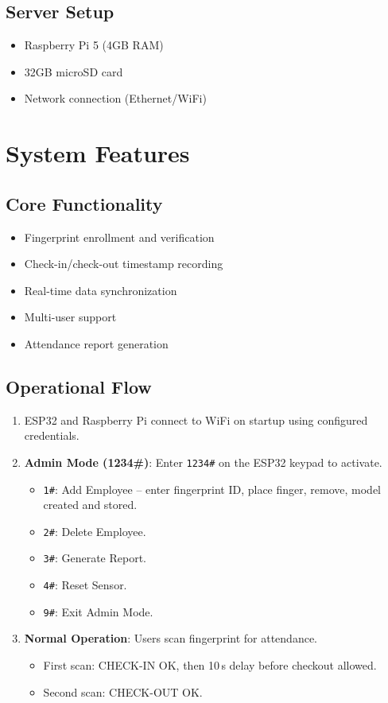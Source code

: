 \documentclass[10pt,a4paper]{article}
\begin{document}
\subsection{Server Setup}
\begin{itemize}
    \item Raspberry Pi 5 (4GB RAM)
    \item 32GB microSD card
    \item Network connection (Ethernet/WiFi)
\end{itemize}

\section{System Features}

\subsection{Core Functionality}
\begin{itemize}
    \item Fingerprint enrollment and verification
    \item Check-in/check-out timestamp recording
    \item Real-time data synchronization
    \item Multi-user support
    \item Attendance report generation
\end{itemize}

\subsection{Operational Flow}
\begin{enumerate}
  \item ESP32 and Raspberry Pi connect to WiFi on startup using configured credentials.
  \item \textbf{Admin Mode (1234\#)}: Enter \texttt{1234\#} on the ESP32 keypad to activate.
  \begin{itemize}
    \item \texttt{1\#}: Add Employee – enter fingerprint ID, place finger, remove, model created and stored.
    \item \texttt{2\#}: Delete Employee.
    \item \texttt{3\#}: Generate Report.
    \item \texttt{4\#}: Reset Sensor.
    \item \texttt{9\#}: Exit Admin Mode.
  \end{itemize}
  \item \textbf{Normal Operation}: Users scan fingerprint for attendance.
  \begin{itemize}
    \item First scan: CHECK-IN OK, then 10\,s delay before checkout allowed.
    \item Second scan: CHECK-OUT OK.
  \end{itemize}
\end{enumerate}
\end{document}
